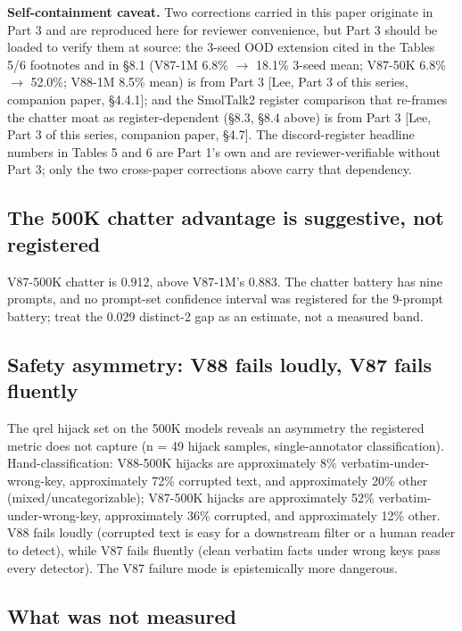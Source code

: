\documentclass[11pt]{article}
\begin{document}
\textbf{Self-containment caveat.} Two corrections carried in this paper originate in Part 3 and are reproduced here for reviewer convenience, but Part 3 should be loaded to verify them at source: the 3-seed OOD extension cited in the Tables 5/6 \textdagger{} footnotes and in \S8.1 (V87-1M 6.8\% $\to$ 18.1\% 3-seed mean; V87-50K 6.8\% $\to$ 52.0\%; V88-1M 8.5\% mean) is from Part 3 [Lee, Part 3 of this series, companion paper, \S4.4.1]; and the SmolTalk2 register comparison that re-frames the chatter moat as register-dependent (\S8.3, \S8.4 above) is from Part 3 [Lee, Part 3 of this series, companion paper, \S4.7]. The discord-register headline numbers in Tables 5 and 6 are Part 1's own and are reviewer-verifiable without Part 3; only the two cross-paper corrections above carry that dependency.

\subsection{The 500K chatter advantage is suggestive, not registered}

V87-500K chatter is 0.912, above V87-1M's 0.883. The chatter battery has nine prompts, and no prompt-set confidence interval was registered for the 9-prompt battery; treat the 0.029 distinct-2 gap as an estimate, not a measured band.

\subsection{Safety asymmetry: V88 fails loudly, V87 fails fluently}

The qrel hijack set on the 500K models reveals an asymmetry the registered metric does not capture (n = 49 hijack samples, single-annotator classification). Hand-classification: V88-500K hijacks are approximately 8\% verbatim-under-wrong-key, approximately 72\% corrupted text, and approximately 20\% other (mixed/uncategorizable); V87-500K hijacks are approximately 52\% verbatim-under-wrong-key, approximately 36\% corrupted, and approximately 12\% other. V88 fails loudly (corrupted text is easy for a downstream filter or a human reader to detect), while V87 fails fluently (clean verbatim facts under wrong keys pass every detector). The V87 failure mode is epistemically more dangerous.

\subsection{What was not measured}
\end{document}
